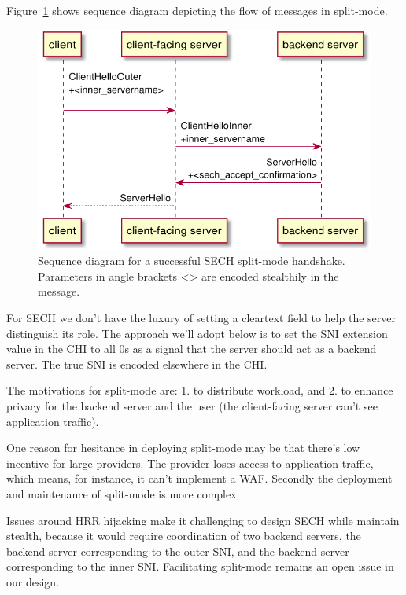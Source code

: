Figure~\ref{fig:sech-split-mode-accept} shows sequence diagram depicting the flow of messages in split-mode.

\begin{figure}[htb]
\centering
\includegraphics[width=\linewidth]{figure/sech-split-mode-accept.pdf}
\captionsetup{width=.8\linewidth} 
\caption[]{Sequence diagram for a successful \ac{SECH} split-mode handshake. Parameters in angle brackets <> are encoded stealthily in the message.}
\label{fig:sech-split-mode-accept}
\end{figure}

For \ac{SECH} we don't have the luxury of setting
a cleartext  field to help the server
distinguish its role.
The approach we'll adopt below is to set the \ac{SNI} extension value in the \ac{CHI} to all 0s
as a signal that the server should act as a backend server.
The true \ac{SNI} is encoded elsewhere in the \ac{CHI}.

The motivations for split-mode are:
1. to distribute workload,
and 2. to enhance privacy for the backend server and the user
(the client-facing server can't see application traffic).

One reason for hesitance in deploying split-mode may be that there's low incentive for large providers.
The provider loses access to application traffic,
which means, for instance, it can't implement a \ac{WAF}.
Secondly the deployment and maintenance
of split-mode is more complex.

Issues around \ac{HRR} hijacking
make it challenging to design \ac{SECH}
while maintain stealth,
because it would require coordination of
two backend servers,
the backend server
corresponding to the outer \ac{SNI},
and the backend server corresponding to the inner \ac{SNI}.
Facilitating split-mode remains an open issue in our design.

